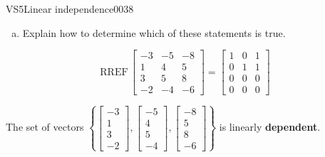 \begin{exercise}{VS5}{Linear independence}{0038}
\begin{exerciseStatement}
\begin{enumerate}[(a)]
     
\item  

 Explain how to determine which of these statements is true. 

 
\end{enumerate}

     \end{exerciseStatement}
 \begin{exerciseAnswer} 

 \[
\mathrm{RREF}\, \left[\begin{array}{ccc}
-3 & -5 & -8 \\
1 & 4 & 5 \\
3 & 5 & 8 \\
-2 & -4 & -6
\end{array}\right] = \left[\begin{array}{ccc}
1 & 0 & 1 \\
0 & 1 & 1 \\
0 & 0 & 0 \\
0 & 0 & 0
\end{array}\right]
            \] 

 

 The set of vectors \(\left\{ \left[\begin{array}{c}
-3 \\
1 \\
3 \\
-2
\end{array}\right] , \left[\begin{array}{c}
-5 \\
4 \\
5 \\
-4
\end{array}\right] , \left[\begin{array}{c}
-8 \\
5 \\
8 \\
-6
\end{array}\right] \right\}\) is linearly \textbf{dependent}. 

 \end{exerciseAnswer}
 \end{exercise}



